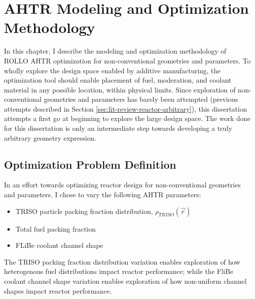 \chapter{AHTR Modeling and Optimization Methodology}
In this chapter, I describe the modeling and optimization methodology of
\gls{ROLLO} \gls{AHTR} optimization for non-conventional geometries and parameters.
To wholly explore the design space enabled by additive manufacturing, the 
optimization tool should enable placement of fuel, moderation, and coolant material 
in any possible location, within physical limits. 
Since exploration of non-conventional geometries and parameters has barely been
attempted (previous attempts described in Section \ref{sec:lit-review-reactor-arbitrary}), 
this dissertation attempts a first go at beginning to explore the large design space.  
The work done for this dissertation is only an intermediate step towards developing 
a truly arbitrary geometry expression. 


\section{Optimization Problem Definition}
In an effort towards optimizing reactor design for non-conventional geometries 
and parameters.
I chose to vary the following \gls{AHTR} parameters: 
\begin{itemize}
    \item \gls{TRISO} particle packing fraction distribution, 
    $\rho_{TRISO}(\vec{r})$
    \item Total fuel packing fraction
    \item \gls{FLiBe} coolant channel shape 
\end{itemize} 
The TRISO packing fraction distribution variation enables exploration of how 
heterogenous fuel distributions impact reactor performance;  
while the FliBe coolant channel shape variation enables exploration of how non-uniform 
channel shapes impact reactor performance. 

